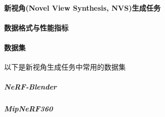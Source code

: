 \paragraph{新视角(Novel View Synthesis, NVS)生成任务}


\paragraph{数据格式与性能指标}


\paragraph{数据集}

以下是新视角生成任务中常用的数据集

\subparagraph{NeRF-Blender}

\subparagraph{MipNeRF360}
